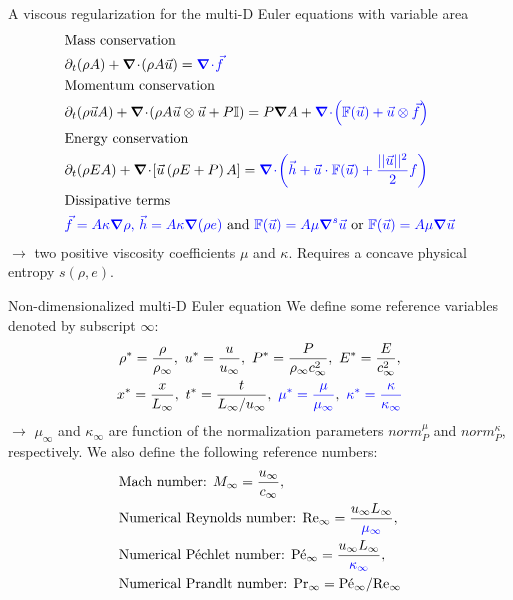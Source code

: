 \documentclass[xcolor=dvipsnames,10pt]{beamer}
\renewcommand{\Re}{\textrm{Re}}
\newcommand{\Pe}{\textrm{P\'e}}
\renewcommand{\Pr}{\textrm{Pr}}
\renewcommand{\div}{\boldsymbol{\nabla}\! \cdot \!}
\newcommand{\grad}{\boldsymbol{\nabla}}
\begin{document}
\begin{frame}{A viscous regularization for the multi-D Euler equations with variable area}
\begin{align}
&\text{Mass conservation} \nonumber \\
&\partial_t ( \rho A ) + \div \left( \rho A \vec{u} \right) = \textcolor{blue}{\div \vec{f}} \nonumber \\
&\text{Momentum conservation} \nonumber \\
&\partial_t ( \rho \vec{u} A ) + \div \left( \rho A \vec{u} \otimes \vec{u} + P \mathbb{I} \right) = P \grad A + \textcolor{blue}{\div \left( \mathbb{F}(\vec{u}) + \vec{u} \otimes \vec{f} \right)} \nonumber \\
&\text{Energy conservation} \nonumber \\
&\partial_t ( \rho E A ) + \div \left[ \vec{u} \left( \rho E + P \right) A \right] = \textcolor{blue}{\div \left( \vec{h} + \vec{u}\cdot \mathbb{F}(\vec{u}) + \frac{|| \vec{u} ||^2}{2} f \right)} \nonumber \\
&\text{Dissipative terms} \nonumber \\
& \textcolor{blue}{\vec{f} = A \kappa \grad \rho \text{, } \vec{h} = A \kappa \grad ( \rho e) } \nonumber
\text{ and } \textcolor{blue}{\mathbb{F}(\vec{u}) = A \mu \grad^s \vec{u}} \text{ or } \textcolor{blue}{\mathbb{F}(\vec{u}) = A \mu \grad \vec{u}}
\end{align}
$\to$ two positive viscosity coefficients $\mu$ and $\kappa$. Requires a concave physical entropy $s(\rho,e)$.
\end{frame}
\begin{frame}{Non-dimensionalized multi-D Euler equation}
We define some reference variables denoted by subscript $\infty$:
\begin{multline}
\label{eq:norm_param}
\rho^*   = \frac{\rho}{\rho_\infty}           ,\
u^*      = \frac{u}{u_\infty}                 ,\
P^*      = \frac{P}{\rho_\infty c^2_\infty}   ,\
E^*      = \frac{E}{c^2_\infty }              ,\\
x^* = \frac{x}{L_\infty}                      ,\
t^* = \frac{t}{L_\infty / u_\infty}           ,\ 
\textcolor{blue}{\mu^*    = \frac{\mu}{\mu_\infty}}             ,\
\textcolor{blue}{\kappa^* = \frac{\kappa}{\kappa_\infty}}     \nonumber
\end{multline}
$\to$ $\mu_\infty$ and $\kappa_\infty$ are function of the normalization parameters $norm_P^\mu$ and $norm_P^\kappa$, respectively.
We also define the following reference numbers:
\begin{align}
&\text{Mach number: }M_\infty = \frac{u_\infty}{c_\infty}, \nonumber\\
&\text{Numerical Reynolds number: }\Re_\infty = \frac{u_\infty L_\infty}{\textcolor{blue}{\mu_\infty}} , \nonumber \\
&\text{Numerical P\'echlet number: }\Pe_\infty = \frac{u_\infty L_\infty}{\textcolor{blue}{\kappa_\infty}} , \nonumber \\
&\text{Numerical Prandlt number: }\Pr_\infty = \Pe_\infty / \Re_\infty \nonumber \nonumber
\end{align}
\end{frame}
\end{document}
